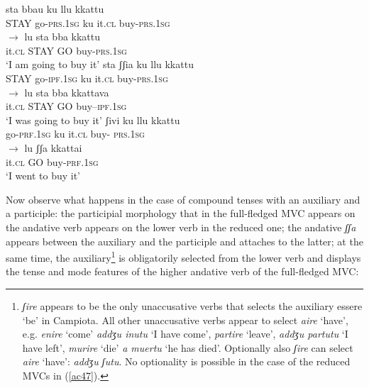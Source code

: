\documentclass[output=paper]{langscibook}
\begin{document}
\ea\label{ac46}
    \ea\label{ac46a}
        \ea \label{ac46ai}\gll sta    bbau     ku   llu   kkattu\\
        STAY go-\textsc{prs}.\textsc{1sg}  ku   it.\textsc{cl} buy-\textsc{prs}.\textsc{1sg}   \\
        \ex \label{ac46aii}$\rightarrow$ \gll lu    sta    bba  kkattu\\
        it.\textsc{cl}  STAY GO  buy-\textsc{prs}.\textsc{1sg} \\
        \glt ‘I am going to buy it’
        \z
    \ex\label{ac46b}
        \ea  \label{ac46bi}\gll sta    ʃʃia       ku   llu    kkattu \\
       STAY go-\textsc{ipf}.\textsc{1sg}  ku   it.\textsc{cl}  buy-\textsc{prs}.\textsc{1sg}  \\
        \ex  \label{ac46bii}$\rightarrow$ \gll lu    sta    bba   kkattava\\
       it.\textsc{cl}   STAY GO   buy--\textsc{ipf}.\textsc{1sg}\\
       \glt ‘I was going to buy it’
        \z
    \ex\label{ac46c}
        \ea  \label{ac46ci}\gll ʃivi       ku   llu   kkattu \\
       go-\textsc{prf}.\textsc{1sg}  ku   it.\textsc{cl}  buy- \textsc{prs}.\textsc{1sg} \\
        \ex  \label{ac46cii}$\rightarrow$ \gll lu     ʃʃa   kkattai\\
       it.\textsc{cl}   GO  buy-\textsc{prf}.\textsc{1sg}\\
       \glt ‘I went to buy it’
        \z
    \z
\z


Now observe what happens in the case of compound tenses with an auxiliary and a participle: the participial morphology that in the full-fledged MVC appears on the andative verb appears on the lower verb in the reduced one; the andative \textit{ʃʃa}  appears between the auxiliary and the participle and attaches to the latter; at the same time, the auxiliary\footnote{\textit{ʃire} appears to be the only unaccusative verbs that selects the auxiliary essere ‘be’ in Campiota.  All other unaccusative verbs appear to select \textit{aire} ‘have’, e.g. \textit{enire} ‘come’ \textit{addʒu inutu} ‘I have come’, \textit{partire} ‘leave’, \textit{addʒu partutu} ‘I have left’, \textit{murire} ‘die’ \textit{a muertu} ‘he has died’. Optionally also \textit{ʃire} can select \textit{aire} ‘have’: \textit{addʒu ʃutu}.  No optionality is possible in the case of the reduced MVCs in (\ref{ac47}).}  is obligatorily selected from the lower verb and displays the tense and mode features of the higher andative verb of the full-fledged MVC:
\end{document}
